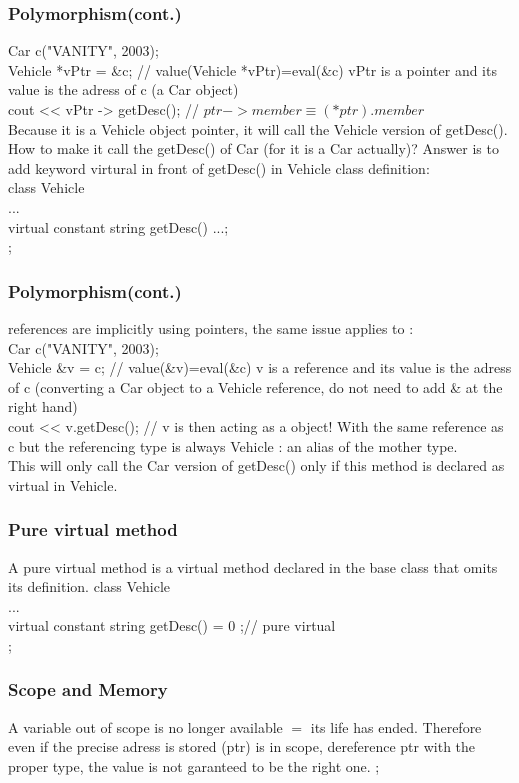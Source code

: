 \documentclass{beamer}
\begin{document}
\begin{frame}
\frametitle{Polymorphism(cont.)}
	Car c("VANITY", 2003);\\
	Vehicle *vPtr = \&c; // value(Vehicle *vPtr)=eval(\&c) vPtr is a pointer and its value is the adress of c (a Car object)\\
	cout << vPtr -> getDesc(); // $ptr->member \equiv (*ptr).member $\\
	Because it is a Vehicle object pointer, it will call the Vehicle version of getDesc(). How to make it call the getDesc() of Car (for it is a Car actually)? Answer is to add keyword virtural in front of getDesc() in Vehicle class definition:\\
	class Vehicle{ \\
		...\\
		virtual constant string getDesc() {...};\\
};
	
\end{frame}
\begin{frame}
\frametitle{Polymorphism(cont.)}
	references are implicitly using pointers, the same issue applies to :\\
	Car c("VANITY", 2003);\\
	Vehicle \&v = c; // value(\&v)=eval(\&c) v is a reference and its value is the adress of c (converting a Car object to a Vehicle reference, do not need to add \& at the right hand) \\
	cout << v.getDesc(); // v is then acting as a object! With the same reference as c but the referencing type is always Vehicle : an alias of the mother type.\\
	This will only call the Car version of getDesc() only if this method is declared as virtual in Vehicle.
\end{frame}
\begin{frame}
\frametitle{Pure virtual method}
A pure virtual method is a virtual method declared in the base class that omits its definition.
	class Vehicle{ \\
		...\\
		virtual constant string getDesc() = 0 ;// pure virtual \\
};

\end{frame}
\begin{frame}
\frametitle{Scope and Memory}
A variable out of scope is no longer available $=$ its life has ended. Therefore even if the precise adress is stored (ptr) is in scope, dereference ptr with the proper type, the value is not garanteed to be the right one.
;
\end{frame}
\end{document}
